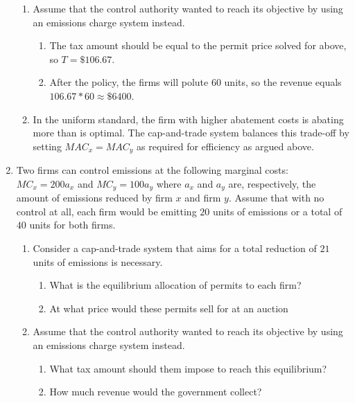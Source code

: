 \documentclass[11pt]{article}
\begin{document}
\begin{enumerate}
{\begin{enumerate}
\begin{enumerate}
        \item The permit price is equal to $MAC_x(a_x^*) = MAC_y(a_y^*) = 80 * 40/3 = 3200/30 \approx \$ 106.67$. 
      \end{enumerate}
    
      \item Assume that the control authority wanted to reach its objective by using an emissions charge system instead.
      \begin{enumerate}
        \item The tax amount should be equal to the permit price solved for above, so $T = \$106.67$. 
        
        \item After the policy, the firms will polute 60 units, so the revenue equals $106.67 * 60 \approx \$ 6400$. 
      \end{enumerate}
    
      \item In the uniform standard, the firm with higher abatement costs is abating more than is optimal. The cap-and-trade system balances this trade-off by setting $MAC_x = MAC_y$ as required for efficiency as argued above.
    \end{enumerate}
  }

  \item Two firms can control emissions at the following marginal costs: $MC_x = 200 a_x$ and $MC_y = 100 a_y$ where $a_x$ and $a_y$ are, respectively, the amount of emissions reduced by firm $x$ and firm $y$. Assume that with no control at all, each firm would be emitting $20$ units of emissions or a total of $40$ units for both firms.

  \begin{enumerate}
    \item Consider a cap-and-trade system that aims for a total reduction of $21$ units of emissions is necessary. 
    \begin{enumerate}
      \item What is the equilibrium allocation of permits to each firm?
      \item At what price would these permits sell for at an auction
    \end{enumerate}

    \item Assume that the control authority wanted to reach its objective by using an emissions
    charge system instead.
    \begin{enumerate}
      \item What tax amount should them impose to reach this equilibrium?
      \item How much revenue would the government collect?
    \end{enumerate}


\end{enumerate}
\end{enumerate}
\end{document}
